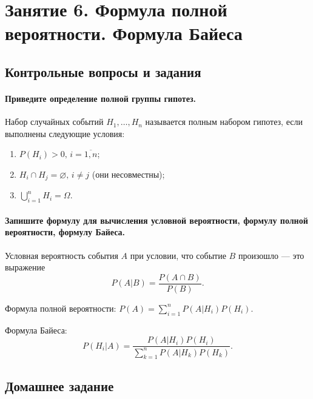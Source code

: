 \chapter*{Занятие 6. Формула полной вероятности. Формула Байеса}

\section*{Контрольные вопросы и задания}

\subsubsection*{Приведите определение полной группы гипотез.}

Набор случайных событий $H_1, \dotsc, H_n$ называется полным набором гипотез, если выполнены следующие условия:
\begin{enumerate}
\item $P \left( H_i \right) > 0, \, i = \overline{1, n} $;
\item $H_i \cap H_j = \varnothing, \, i \neq j$ (они несовместны);
\item $ \bigcup \limits_{i=1}^n H_i = \Omega $.
\end{enumerate}

\subsubsection*{Запишите формулу для вычисления условной вероятности, формулу полной вероятности, формулу Байеса.}

Условная вероятность события $A$ при условии, что событие $B$ произошло --- это выражение
$$P \left( \left. A \right| B \right) =
\frac{P \left( A \cap B \right) }{P \left( B \right) }.$$

Формула полной вероятности: $P \left( A \right) = \sum \limits_{i=1}^n P \left( \left. A \right| H_i \right) P \left( H_i \right) $.

Формула Байеса:
$$P \left( \left. H_i \right| A \right) =
\frac{P \left( \left. A \right| H_i \right) P \left( H_i \right) }{ \sum \limits_{k=1}^n P \left( \left. A \right| H_k \right) P \left( H_k \right) }.$$

\section*{Домашнее задание}

